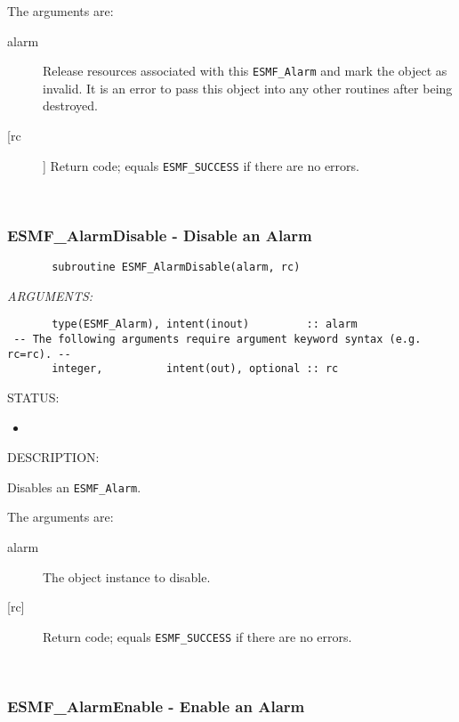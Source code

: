        The arguments are:
       \begin{description}
       \item[alarm]
         Release resources associated with this {\tt ESMF\_Alarm} and mark the
         object as invalid.  It is an error to pass this object into any other
         routines after being destroyed.
       \item[[rc]]
         Return code; equals {\tt ESMF\_SUCCESS} if there are no errors.
       \end{description}
   
 
\mbox{}\hrulefill\ 
 
\subsubsection [ESMF\_AlarmDisable] {ESMF\_AlarmDisable - Disable an Alarm}


 
\begin{verbatim}       subroutine ESMF_AlarmDisable(alarm, rc)
 \end{verbatim}{\em ARGUMENTS:}
\begin{verbatim}       type(ESMF_Alarm), intent(inout)         :: alarm
 -- The following arguments require argument keyword syntax (e.g. rc=rc). --
       integer,          intent(out), optional :: rc
 \end{verbatim}
{\sf STATUS:}
   \begin{itemize}
   \item{}
   \end{itemize}
  
{\sf DESCRIPTION:\\ }


       Disables an {\tt ESMF\_Alarm}.
  
       The arguments are:
       \begin{description}
       \item[alarm]
            The object instance to disable.
       \item[{[rc]}]
            Return code; equals {\tt ESMF\_SUCCESS} if there are no errors.
       \end{description} 
 
\mbox{}\hrulefill\ 
 
\subsubsection [ESMF\_AlarmEnable] {ESMF\_AlarmEnable - Enable an Alarm}


